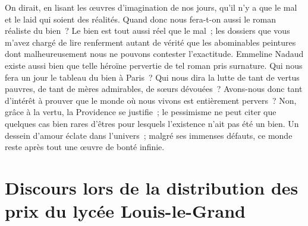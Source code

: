 \documentclass[french,twoside]{book} %
\newcommand\orgName[1]{#1}
\newcommand\persName[1]{#1}
\newcommand{\dateline}[1]{\medskip{\RaggedLeft{#1}\par}\bigskip}
\begin{document}
On dirait, en lisant les œuvres d’imagination de nos jours, qu’il n’y a que le mal et le laid qui soient des réalités. Quand donc nous fera-t-on aussi le roman réaliste du bien ? Le bien est tout aussi réel que le mal ; les dossiers que vous m’avez chargé de lire renferment autant de vérité que les abominables peintures dont malheureusement nous ne pouvons contester l’exactitude. {\persName Emmeline Nadaud} existe aussi bien que telle héroïne pervertie de tel roman pris surnature. Qui nous fera un jour le tableau du bien à Paris ? Qui nous dira la lutte de tant de vertus pauvres, de tant de mères admirables, de sœurs dévouées ? Avons-nous donc tant d’intérêt à prouver que le monde où nous vivons est entièrement pervers ? Non, grâce à la vertu, la Providence se justifie ; le pessimisme ne peut citer que quelques cas bien rares d’êtres pour lesquels l’existence n’ait pas été un bien. Un dessein d’amour éclate dans l’univers ; malgré ses immenses défauts, ce monde reste après tout une œuvre de bonté infinie.
\section[{Discours lors de la distribution des prix du lycée Louis-le-Grand}]{Discours lors de la distribution des prix du lycée {\orgName Louis-le-Grand}}\renewcommand{\leftmark}{Discours lors de la distribution des prix du lycée {\orgName Louis-le-Grand}}


\dateline{7 août 1883}
\end{document}
